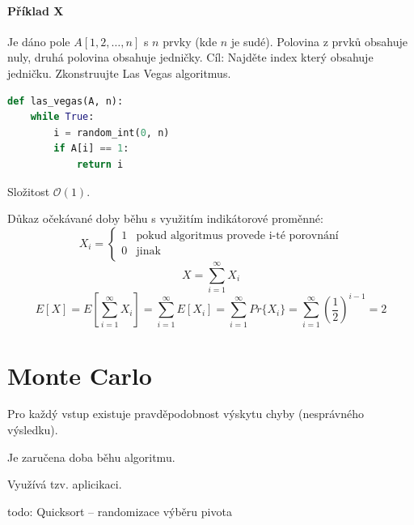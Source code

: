 \paragraph*{Příklad X} Je dáno pole $A[1, 2, \dots, n]$ s $n$ prvky (kde $n$ je sudé). Polovina z prvků obsahuje nuly, druhá polovina obsahuje jedničky. Cíl: Najděte index který obsahuje jedničku. Zkonstruujte Las Vegas algoritmus.

\bigskip\noindent\begin{minipage}{\linewidth}
\begin{lstlisting}[language=Python, caption={Las Vegas}]
def las_vegas(A, n):
    while True:
        i = random_int(0, n)
        if A[i] == 1:
            return i
\end{lstlisting}
\end{minipage}

\begin{compactitem}
    \item Složitost $\mathcal{O}(1)$.
    \item Důkaz očekávané doby běhu s využitím indikátorové proměnné:
    $$ X_i = \left\{
        \begin{array}{ll}
            1 & \text{pokud algoritmus provede i-té porovnání} \\
            0 & \text{jinak}
        \end{array}
    \right. $$
    $$ X = \sum_{i=1}^{\infty} X_i $$
    $$ E[X] = E \left[ \sum_{i=1}^{\infty} X_i \right] = \sum_{i=1}^{\infty} E \left[ X_i \right] = \sum_{i=1}^{\infty} Pr\{ X_i \} =\sum_{i=1}^{\infty} \left(\frac{1}{2}\right)^{i-1} = 2$$
\end{compactitem}


\section{Monte Carlo}

\begin{compactitem}
    \item Pro každý vstup existuje pravděpodobnost výskytu chyby (nesprávného výsledku).

    \item Je zaručena doba běhu algoritmu.

    \item Využívá tzv. aplicikaci.

    \item todo: Quicksort -- randomizace výběru pivota
\end{compactitem}

